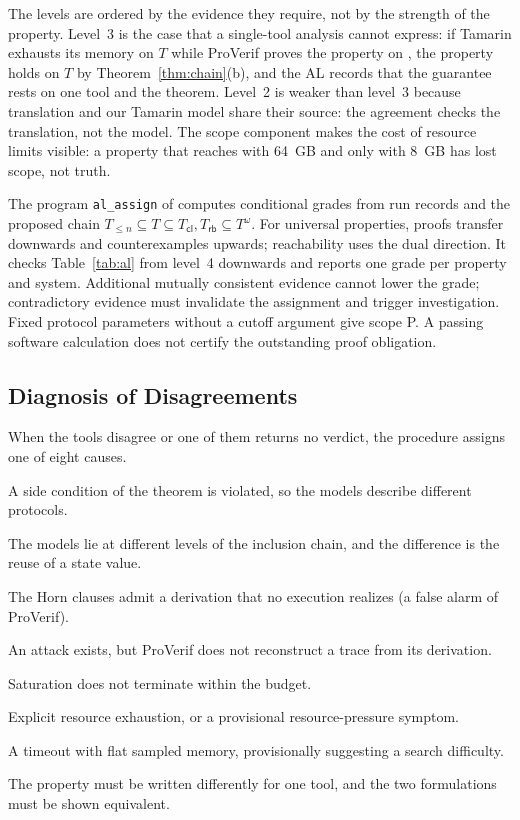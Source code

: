 The levels are ordered by the evidence they require, not by the strength of the property. Level~3 is the case that a single-tool analysis cannot express: if Tamarin exhausts its memory on $T$ while ProVerif proves the property on \PVlin, the property holds on $T$ by Theorem~\ref{thm:chain}(b), and the AL records that the guarantee rests on one tool and the theorem. Level~2 is weaker than level~3 because translation and our Tamarin model share their source: the agreement checks the translation, not the model. The scope component makes the cost of resource limits visible: a property that reaches  with 64~GB and only  with 8~GB has lost scope, not truth.

The program \texttt{al\_assign} of \cimc computes conditional grades from run records and the proposed chain $T_{\le n} \subseteq T \subseteq T_{\mathsf{cl}}, T_{\mathsf{rb}} \subseteq T^{\omega}$. For universal properties, proofs transfer downwards and counterexamples upwards; reachability uses the dual direction. It checks Table~\ref{tab:al} from level~4 downwards and reports one grade per property and system. Additional mutually consistent evidence cannot lower the grade; contradictory evidence must invalidate the assignment and trigger investigation. Fixed protocol parameters without a cutoff argument give scope P. A passing software calculation does not certify the outstanding proof obligation.

\subsection{Diagnosis of Disagreements}\label{sec:method:diag}

When the tools disagree or one of them returns no verdict, the procedure assigns one of eight causes.
\begin{description}[leftmargin=5.2em,labelwidth=4.9em,font=\normalfont\ttfamily\small]
\item[ENC-map] A side condition of the theorem is violated, so the models describe different protocols.
\item[ENC-clone] The models lie at different levels of the inclusion chain, and the difference is the reuse of a state value.
\item[PV-abs] The Horn clauses admit a derivation that no execution realizes (a false alarm of ProVerif).
\item[PV-rec] An attack exists, but ProVerif does not reconstruct a trace from its derivation.
\item[PV-term] Saturation does not terminate within the budget.
\item[TM-res] Explicit resource exhaustion, or a provisional resource-pressure symptom.
\item[TM-search] A timeout with flat sampled memory, provisionally suggesting a search difficulty.
\item[SPEC-expr] The property must be written differently for one tool, and the two formulations must be shown equivalent.
\end{description}

